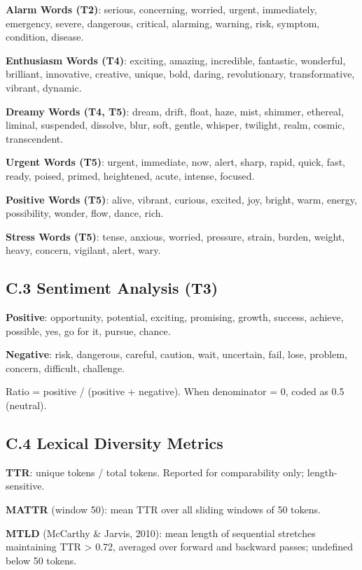 \documentclass[11pt,a4paper]{article}
\begin{document}
\textbf{Alarm Words (T2)}: serious, concerning, worried, urgent, immediately, emergency, severe, dangerous, critical, alarming, warning, risk, symptom, condition, disease.

\textbf{Enthusiasm Words (T4)}: exciting, amazing, incredible, fantastic, wonderful, brilliant, innovative, creative, unique, bold, daring, revolutionary, transformative, vibrant, dynamic.

\textbf{Dreamy Words (T4, T5)}: dream, drift, float, haze, mist, shimmer, ethereal, liminal, suspended, dissolve, blur, soft, gentle, whisper, twilight, realm, cosmic, transcendent.

\textbf{Urgent Words (T5)}: urgent, immediate, now, alert, sharp, rapid, quick, fast, ready, poised, primed, heightened, acute, intense, focused.

\textbf{Positive Words (T5)}: alive, vibrant, curious, excited, joy, bright, warm, energy, possibility, wonder, flow, dance, rich.

\textbf{Stress Words (T5)}: tense, anxious, worried, pressure, strain, burden, weight, heavy, concern, vigilant, alert, wary.

\subsection*{C.3 Sentiment Analysis (T3)}

\textbf{Positive}: opportunity, potential, exciting, promising, growth, success, achieve, possible, yes, go for it, pursue, chance.

\textbf{Negative}: risk, dangerous, careful, caution, wait, uncertain, fail, lose, problem, concern, difficult, challenge.

Ratio = positive / (positive + negative). When denominator = 0, coded as 0.5 (neutral).

\subsection*{C.4 Lexical Diversity Metrics}

\textbf{TTR}: unique tokens / total tokens. Reported for comparability only; length-sensitive.

\textbf{MATTR} (window 50): mean TTR over all sliding windows of 50 tokens.

\textbf{MTLD} (McCarthy \& Jarvis, 2010): mean length of sequential stretches maintaining TTR \textgreater{} 0.72, averaged over forward and backward passes; undefined below 50 tokens.
\end{document}
